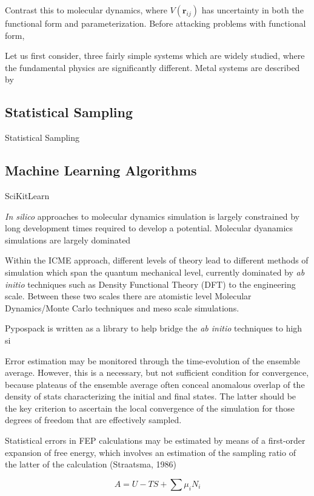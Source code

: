 Contrast this to molecular dynamics, where $V(\bm{r}_{ij})$ has uncertainty in both the functional form and parameterization.  Before attacking problems with functional form,

Let us first consider, three fairly simple systems which are widely studied, where the fundamental physics are significantly different.  Metal systems are described by

\subsection{Statistical Sampling}

Statistical Sampling

\subsection{Machine Learning Algorithms}

SciKitLearn

\emph{In silico} approaches to molecular dynamics simulation is largely constrained by long development times required to develop a potential.  Molecular dyanamics simulations are largely dominated

Within the ICME approach, different levels of theory lead to different methods of simulation which span the quantum mechanical level, currently dominated by \emph{ab initio} techniques such as Density Functional Theory (DFT) to the engineering scale.  Between these two scales there are atomistic level Molecular Dynamics/Monte Carlo techniques and meso scale simulations.

Pypospack is written as a library to help bridge the \emph{ab initio} techniques to high si



Error estimation may be monitored through the time-evolution of the ensemble average.  However, this is a necessary, but not sufficient condition for convergence, because plateaus of the ensemble average often conceal anomalous overlap of the density of stats characterizing the initial and final states.  The latter should be the key criterion to ascertain the local convergence of the simulation for those degrees of freedom that are effectively sampled.

Statistical errors in FEP calculations may be estimated by means of a first-order expansion of free energy, which involves an estimation of the sampling ratio of the latter of the calculation (Straatsma, 1986)

\begin{equation}\label{eq:helmoholtz_free_energy}
  A = U-TS + \sum \mu_i N_i
\end{equation}

